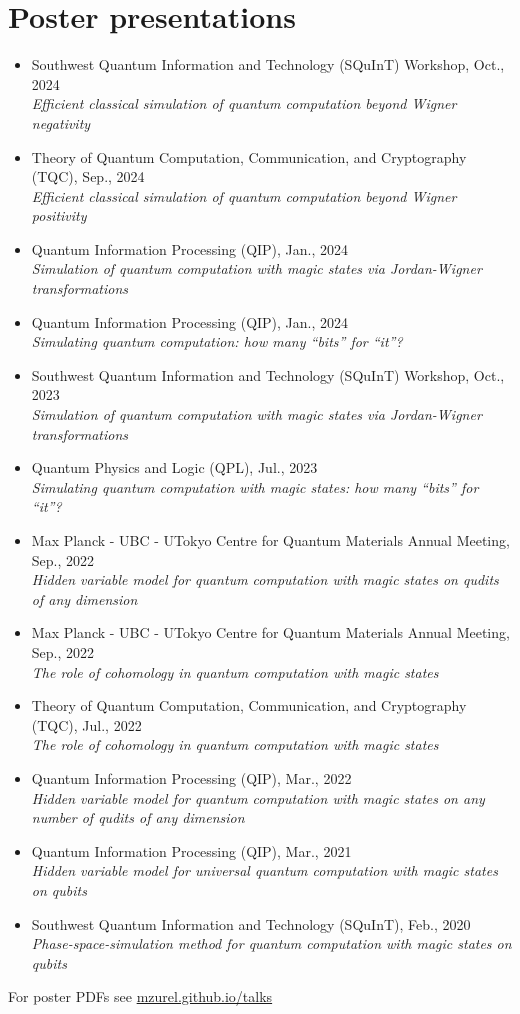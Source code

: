 \documentclass[letterpaper,11pt]{article}
\newcommand{\ConferenceItem}[3]{
	\item{\parbox{0.97\textwidth}{
		{#1}  \hfill {#2}\\
		\emph{#3}
	}}
}
\begin{document}
\section*{Poster presentations}
\begin{itemize}[leftmargin=*]
	\ConferenceItem{Southwest Quantum Information and Technology (SQuInT) Workshop, Oct., 2024}{}{Efficient classical simulation of quantum computation beyond Wigner negativity}
	
	\ConferenceItem{Theory of Quantum Computation, Communication, and Cryptography (TQC), Sep., 2024}{}{Efficient classical simulation of quantum computation beyond Wigner positivity}
	
	\ConferenceItem{Quantum Information Processing (QIP), Jan., 2024}{}{Simulation of quantum computation with magic states via Jordan-Wigner transformations}
	
	\ConferenceItem{Quantum Information Processing (QIP), Jan., 2024}{}{Simulating quantum computation: how many ``bits'' for ``it''?}
	
	\ConferenceItem{Southwest Quantum Information and Technology (SQuInT) Workshop, Oct., 2023}{}{Simulation of quantum computation with magic states via Jordan-Wigner transformations}
	
	\ConferenceItem{Quantum Physics and Logic (QPL), Jul., 2023}{}{Simulating quantum computation with magic states: how many ``bits'' for ``it''?}
	
	\ConferenceItem{Max Planck - UBC - UTokyo Centre for Quantum Materials Annual Meeting, Sep., 2022}{}{Hidden variable model for quantum computation with magic states on qudits of any dimension}
	
	\ConferenceItem{Max Planck - UBC - UTokyo Centre for Quantum Materials Annual Meeting, Sep., 2022}{}{The role of cohomology in quantum computation with magic states}
	
	\ConferenceItem{Theory of Quantum Computation, Communication, and Cryptography (TQC), Jul., 2022}{}{The role of cohomology in quantum computation with magic states}
	
	\ConferenceItem{Quantum Information Processing (QIP), Mar., 2022}{}{Hidden variable model for quantum computation with magic states on any number of qudits of any dimension}
	
	\ConferenceItem{Quantum Information Processing (QIP), Mar., 2021}{}{Hidden variable model for universal quantum computation with magic states on qubits}
	
	\ConferenceItem{Southwest Quantum Information and Technology (SQuInT), Feb., 2020}{}{Phase-space-simulation method for quantum computation with magic states on qubits}
\end{itemize}
For poster PDFs see \href{https://mzurel.github.io/talks}{mzurel.github.io/talks}
\end{document}
